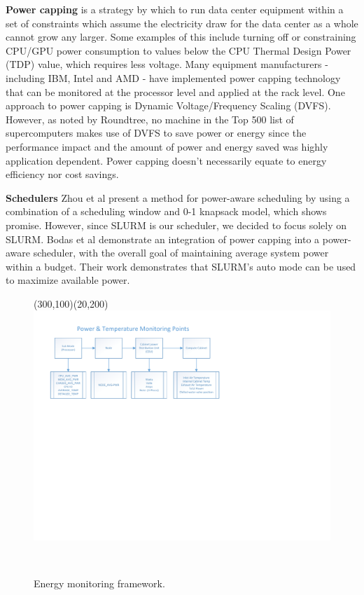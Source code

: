 \textbf{Power capping} is a strategy by which to run data center equipment within a set of constraints which assume the electricity draw for the data center as a whole cannot grow any larger. Some examples of this include turning off or constraining CPU/GPU power consumption to values below the CPU Thermal Design Power (TDP) value, which requires less voltage. Many equipment manufacturers - including IBM, Intel and AMD - have implemented power capping technology that can be monitored at the processor level and applied at the rack level. One approach to power capping is Dynamic Voltage/Frequency Scaling (DVFS). However, as noted by Roundtree\cite{Roundtree2012}, no machine in the Top 500 list of supercomputers makes use of DVFS to save power or energy since the performance impact and the amount of power and energy saved was highly application dependent. Power capping doesn't necessarily equate to energy efficiency nor cost savings.

\textbf{Schedulers} Zhou et al\cite{Zhou2014} present a method for power-aware scheduling by using a combination of a scheduling window and 0-1 knapsack model, which shows promise. However, since SLURM is our scheduler, we decided to focus solely on SLURM. Bodas et al\cite{Bodas2014} demonstrate an integration of power capping into a power-aware scheduler, with the overall goal of maintaining average system power within a budget. Their work demonstrates that SLURM’s auto mode can be used to maximize available power.  

\begin{figure}[t]
	\begin{center}
		
				\begin{picture}(300,100)(20,200)
				\includegraphics[scale=0.50]{edeals/ray_fig}
				\end{picture}\\
	\end{center}
	\caption{Energy monitoring framework.}
	\label{ray_fig}
\end{figure}


